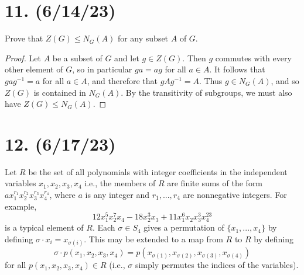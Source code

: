 \documentclass{article}
\begin{document}
\section*{11. (6/14/23)}

Prove that $Z(G) \leq N_G(A)$ for any subset $A$ of $G$.

\begin{proof}
    Let $A$ be a subset of $G$ and let $g \in Z(G)$. Then $g$ commutes with every other element of $G$, so in particular $ga = ag$ for all $a \in A$. It follows that $gag^{-1} = a$ for all $a \in A$, and therefore that $gAg^{-1} = A$. Thus $g \in N_G(A)$, and so $Z(G)$ is contained in $N_G(A)$. By the transitivity of subgroups, we must also have $Z(G) \leq N_G(A)$.
\end{proof}

\section*{12. (6/17/23)}

Let $R$ be the set of all polynomials with integer coefficients in the independent variables $x_1, x_2, x_3, x_4$ i.e., the members of $R$ are finite sums of the form $ax_1^{r_1}x_2^{r_2}x_3^{r_3}x_4^{r_4}$, where $a$ is any integer and $r_1, ..., r_4$ are nonnegative integers. For example,
\begin{equation*}
    12x_1^5 x_2^7 x_4 - 18x_2^3 x_3 + 11 x_1^6 x_2 x_3^3 x_4^{23}
\end{equation*}
is a typical element of $R$. Each $\sigma \in S_4$ gives a permutation of $\{ x_1, ..., x_4 \}$ by defining $\sigma \cdot x_i = x_{\sigma(i)}$. This may be extended to a map from $R$ to $R$ by defining
\begin{equation*}
    \sigma \cdot p(x_1, x_2, x_3, x_4) = p(x_{\sigma(1)}, x_{\sigma(2)}, x_{\sigma(3)}, x_{\sigma(4)})
\end{equation*}
for all $p(x_1, x_2, x_3, x_4) \in R$ (i.e., $\sigma$ simply permutes the indices of the variables).
\end{document}
